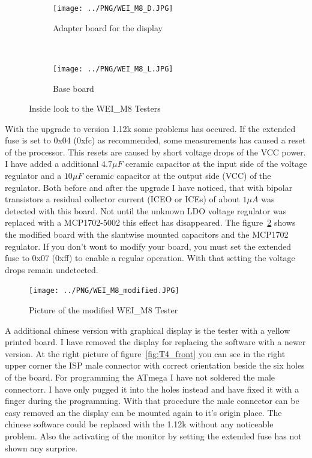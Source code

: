 \begin{figure}[H]
  \begin{subfigure}[b]{.5\textwidth}
    \centering
    \texttt{[image: ../PNG/WEI\_M8\_D.JPG]}
    \caption{Adapter board for the display}
  \end{subfigure}
  ~
  \begin{subfigure}[b]{.5\textwidth}
    \centering
    \texttt{[image: ../PNG/WEI\_M8\_L.JPG]}
    \caption{Base board}
  \end{subfigure}
  \caption{Inside look to the WEI\_M8 Testers}
  \label{fig:WeiM8int}
\end{figure}

With the upgrade to version 1.12k some problems has occured.
If the extended fuse is set to 0x04 (0xfc) as recommended, some measurements has
caused a  reset of the processor.
This resets are caused by short voltage drops of the VCC power.
I have added a additional \(4.7\mu F\) ceramic capacitor at the input side of
the voltage regulator and a \(10\mu F\) ceramic capacitor at the output side (VCC)
of the regulator.
Both before and after the upgrade I have noticed, that with bipolar transistors
a residual collector current (ICEO or ICEs) of about \(1\mu A\) was detected with this board.
Not until the unknown LDO voltage regulator was replaced with a MCP1702-5002 this
effect has disappeared. The figure~\ref{fig:WeiM8mod} shows the modified board with
the slantwise mounted capacitors and the MCP1702 regulator.
If you don't wont to modify your board, you must set the extended fuse to 0x07 (0xff)
to enable a regular operation. With that setting the voltage drops remain undetected.

\begin{figure}[H]
\centering
\texttt{[image: ../PNG/WEI\_M8\_modified.JPG]}
\caption{Picture of the modified WEI\_M8 Tester}
\label{fig:WeiM8mod}
\end{figure}

A additional chinese version with graphical display is the  tester with a yellow 
printed board.
I have removed the display for replacing the software with a newer version.
At the right picture of figure~\ref{fig:T4_front} you can see in the right upper corner the ISP male connector
with correct orientation beside the six holes of the board.
For programming the ATmega I have not soldered the male connectorr. I have only pugged it into
the holes instead and have fixed it with a finger during the programming.
With that procedure the male connector can be easy removed an the display can be mounted again to
it's origin place.
The chinese software could be replaced with the 1.12k without any noticeable problem. 
Also the activating of the  monitor by setting the extended fuse has not
shown any surprice.

